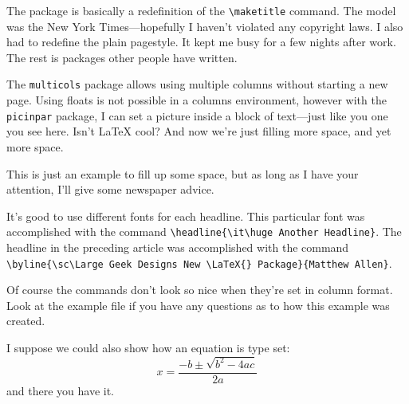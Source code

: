 \documentclass{article}\usepackage[]{graphicx}\usepackage[]{color}
\date{\today}
\begin{document}
\maketitle

\begin{multicols}{2}{


The package is basically a redefinition of the \verb+\maketitle+ command.  The model was the New York Times---hopefully I haven't violated any copyright laws.  I also had to redefine the plain pagestyle.  It kept me busy for a few nights after work.  The rest is packages other people have written.      

\begin{window} The \verb+multicols+ package allows using multiple columns without starting a new page.  Using floats is not possible in a columns environment, however with the \verb+picinpar+ package, I can set a picture inside a block of text---just like you one you see here.  Isn't \LaTeX{} cool?
And now we're just filling more space, and yet more space.  
\end{window}
\closearticle


This is just an example to fill up some space, but as long as I have your attention, I'll give some newspaper advice.

It's good to use different fonts for each headline.  This particular font was accomplished with the command \verb+\headline{\it\huge Another Headline}+.  The headline in the preceding article was accomplished with the command \verb+\byline{\sc\Large Geek Designs New \LaTeX{} Package}{Matthew Allen}+.

Of course the commands don't look so nice when they're set in column format.  Look at the example file if you have any questions as to how this example was created.

I suppose we could also show how an equation is type set:
\begin{displaymath}
x=\frac{-b\pm\sqrt{b^2-4ac}}{2a}
\end{displaymath}
and there you have it.  \closearticle
}
\end{multicols}
\end{document}
